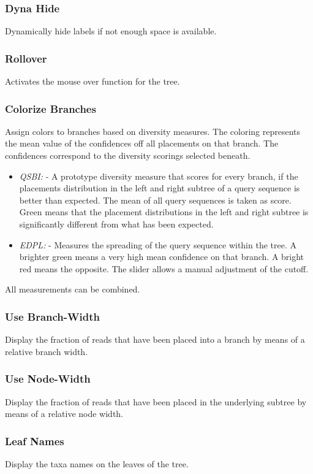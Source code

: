 \documentclass{article}
\begin{document}
        \subsubsection*{Dyna Hide} Dynamically hide labels if not enough space is available.
        \subsubsection*{Rollover} Activates the mouse over function for the tree. 
        \subsubsection*{Colorize Branches} Assign colors to branches based on diversity measures. The coloring represents the mean value of the confidences off all placements on that branch. The confidences correspond to the diversity scorings selected beneath.
        \begin{itemize}
       		\item \textit{QSBI:} - A prototype diversity measure that scores for every branch, if the placements distribution in the left and right subtree of a query sequence is better than expected. The mean of all query sequences is taken as score. Green means that the placement distributions in the left and right subtree is significantly different from what has been expected.
        	\item \textit{EDPL:} - Measures the spreading of the query sequence within the tree. A brighter green means a very high mean confidence on that branch. A bright red means the opposite. The slider allows a manual adjustment of the cutoff.
        \end{itemize}
        All measurements can be combined. 
        \subsubsection*{Use Branch-Width} Display the fraction of reads that have been placed into a branch by means of a relative branch width.
        \subsubsection*{Use Node-Width} Display the fraction of reads that have been placed in the underlying subtree by means of a relative node width.
        \subsubsection*{Leaf Names} Display the taxa names on the leaves of the tree.
\end{document}
